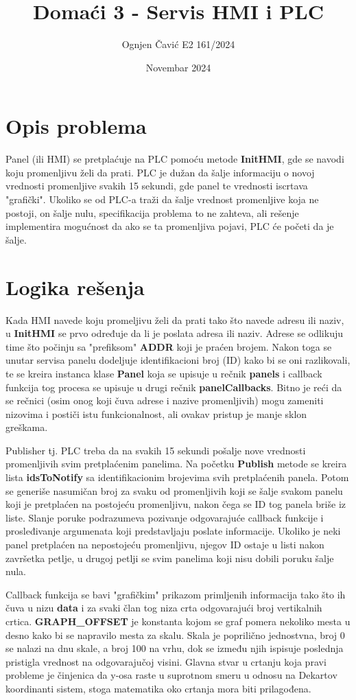 \documentclass[11pt]{article}
\title{Domaći 3 - Servis HMI i PLC}
\author{Ognjen Čavić E2 161/2024}
\date{Novembar 2024}
\begin{document}
\maketitle
\section{Opis problema}
Panel (ili HMI) se pretplaćuje na PLC pomoću metode \textbf{InitHMI}, gde se
navodi koju promenljivu želi da prati.
PLC je dužan da šalje informaciju o novoj vrednosti promenljive svakih 15
sekundi, gde panel te vrednosti iscrtava "grafički".
Ukoliko se od PLC-a traži da šalje vrednost promenljive koja ne postoji, on
šalje nulu, specifikacija problema to ne zahteva, ali rešenje implementira
mogućnost da ako se ta promenljiva pojavi, PLC će početi da je šalje.
\section{Logika rešenja}
Kada HMI navede koju promeljivu želi da prati tako što navede adresu
ili naziv, u \textbf{InitHMI} se prvo određuje da li je poslata adresa ili 
naziv.
Adrese se odlikuju time što počinju sa "prefiksom" \textbf{ADDR} koji je praćen
brojem.
Nakon toga se unutar servisa panelu dodeljuje identifikacioni broj (ID) kako bi
se oni razlikovali, te se kreira instanca klase \textbf{Panel} koja se upisuje
u rečnik \textbf{panels} i callback funkcija tog procesa se upisuje u drugi
rečnik \textbf{panelCallbacks}.
Bitno je reći da se rečnici (osim onog koji čuva adrese i nazive promenljivih) 
mogu zameniti nizovima i postiči istu funkcionalnost, ali ovakav pristup je
manje sklon greškama.
\par Publisher tj. PLC treba da na svakih 15 sekundi pošalje nove vrednosti
promenljivih svim pretplaćenim panelima.
Na početku \textbf{Publish} metode se kreira lista \textbf{idsToNotify} sa
identifikacionim brojevima svih pretplaćenih panela.
Potom se generiše nasumičan broj za svaku od promenljivih koji se šalje svakom
panelu koji je pretplaćen na postojeću promenljivu, nakon čega se ID tog panela
briše iz liste.
Slanje poruke podrazumeva pozivanje odgovarajuće callback funkcije i prosleđivanje
argumenata koji predstavljaju poslate informacije.
Ukoliko je neki panel pretplaćen na nepostojeću promenljivu, njegov ID ostaje
u listi nakon završetka petlje, u drugoj petlji se svim panelima koji nisu 
dobili poruku šalje nula.
\par Callback funkcija se bavi "grafičkim" prikazom primljenih informacija tako
što ih čuva u nizu \textbf{data} i za svaki član tog niza crta odgovarajući broj
vertikalnih crtica.
\textbf{GRAPH\_OFFSET} je konstanta kojom se graf pomera nekoliko mesta u desno
kako bi se napravilo mesta za skalu.
Skala je poprilično jednostvna, broj 0 se nalazi na dnu skale, a broj 100 na
vrhu, dok se između njih ispisuje poslednja pristigla vrednost na odgovarajučoj
visini.
Glavna stvar u crtanju koja pravi probleme je činjenica da y-osa raste u
suprotnom smeru u odnosu na Dekartov koordinanti sistem, stoga matematika oko
crtanja mora biti prilagođena.
\end{document}
